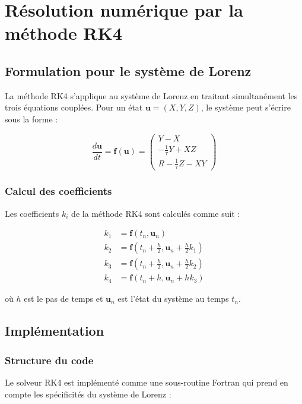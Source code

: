 \section{Résolution numérique par la méthode RK4}

\subsection{Formulation pour le système de Lorenz}
La méthode RK4 s'applique au système de Lorenz en traitant simultanément les trois équations couplées. Pour un état $\mathbf{u} = (X, Y, Z)$, le système peut s'écrire sous la forme :

\begin{equation}
\frac{d\mathbf{u}}{dt} = \mathbf{f}(\mathbf{u}) = \begin{pmatrix}
Y - X \\
-\frac{1}{\tau}Y + XZ \\
R - \frac{1}{\tau}Z - XY
\end{pmatrix}
\end{equation}

\subsubsection{Calcul des coefficients}
Les coefficients $k_i$ de la méthode RK4 sont calculés comme suit :

\begin{align}
k_1 &= \mathbf{f}(t_n, \mathbf{u}_n) \\
k_2 &= \mathbf{f}(t_n + \frac{h}{2}, \mathbf{u}_n + \frac{h}{2}k_1) \\
k_3 &= \mathbf{f}(t_n + \frac{h}{2}, \mathbf{u}_n + \frac{h}{2}k_2) \\
k_4 &= \mathbf{f}(t_n + h, \mathbf{u}_n + hk_3)
\end{align}

où $h$ est le pas de temps et $\mathbf{u}_n$ est l'état du système au temps $t_n$.

\subsection{Implémentation}

\subsubsection{Structure du code}
Le solveur RK4 est implémenté comme une sous-routine Fortran qui prend en compte les spécificités du système de Lorenz :

